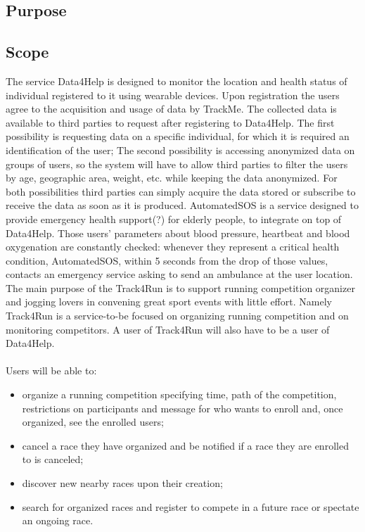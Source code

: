 \subsection{Purpose}

\subsection{Scope}
The service Data4Help is designed to monitor the location and health status of individual registered to it using wearable devices. Upon registration the users agree to the acquisition and usage of data by TrackMe. 
The collected data is available to third parties to request after registering to Data4Help. The first possibility is requesting data on a specific individual, for which it is required an identification of the user; The second possibility is accessing anonymized data on groups of users, so the system will have to allow third parties to filter the users by age, geographic area, weight, etc. while keeping the data anonymized.
For both possibilities third parties can simply acquire the data stored or subscribe to receive the data as soon as it is produced.
AutomatedSOS is a service designed to provide emergency health support(?) for elderly people, to integrate on top of Data4Help. Those users’ parameters about blood pressure, heartbeat and blood oxygenation are constantly checked: whenever they represent a critical health condition, AutomatedSOS, within 5 seconds from the drop of those values, contacts an emergency service asking to send an ambulance at the user location.
The main purpose of the Track4Run is to support running competition organizer and jogging lovers in convening great sport events with little effort. Namely Track4Run is a service-to-be focused on organizing running competition and on monitoring competitors. A user of Track4Run will also have to be a user of Data4Help. 
\\ \\Users will be able to: 
\begin{itemize}
\item 
organize a running competition specifying time, path of the competition, restrictions on participants and message for who wants to enroll and, once organized, see the enrolled users; 
\item 
cancel a race they have organized and be notified if a race they are enrolled to is canceled; 
\item 
discover new nearby races upon their creation; 
\item 
search for organized races and register to compete in a future race or spectate an ongoing race.
\end{itemize}
